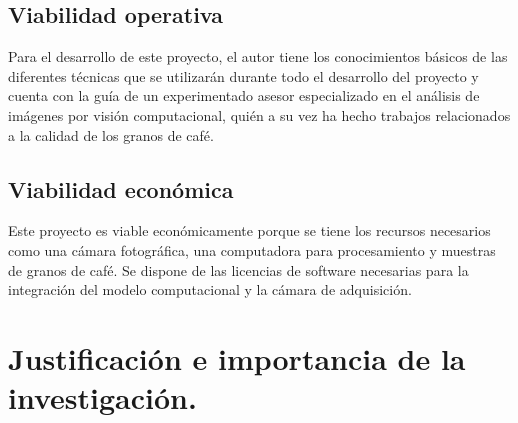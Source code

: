 \subsection{Viabilidad operativa}
Para el desarrollo de este proyecto, el autor tiene los conocimientos básicos de las diferentes técnicas que se utilizarán durante todo el desarrollo del proyecto y cuenta con la guía de un experimentado asesor especializado en el análisis de imágenes por visión computacional, quién a su vez ha hecho trabajos relacionados a la calidad de los granos de café.

\subsection{Viabilidad económica}
Este proyecto es viable económicamente porque se tiene los recursos necesarios como una cámara fotográfica, una computadora para procesamiento y muestras de granos de café.  Se dispone de las licencias de software necesarias para la integración del modelo computacional y la cámara de adquisición. 


\section{Justificación e importancia de la investigación.}

